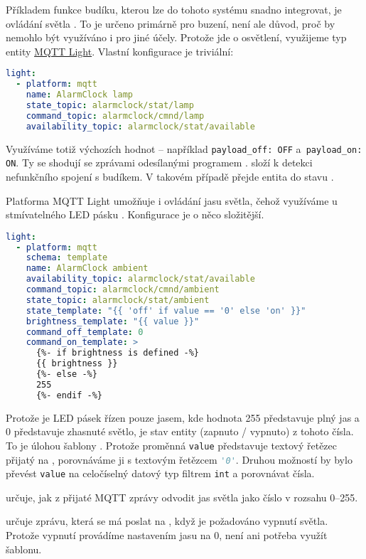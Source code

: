 Příkladem funkce budíku, kterou lze do tohoto systému snadno integrovat, je
ovládání světla . To je určeno primárně pro buzení, není ale důvod,
proč by nemohlo být využíváno i pro jiné účely. Protože jde o osvětlení,
využijeme typ entity
\href{https://www.home-assistant.io/integrations/light.mqtt}{MQTT Light}.
Vlastní konfigurace je triviální:
\begin{lstlisting}[language=yaml]
light:
  - platform: mqtt
    name: AlarmClock lamp
    state_topic: alarmclock/stat/lamp
    command_topic: alarmclock/cmnd/lamp
    availability_topic: alarmclock/stat/available
\end{lstlisting}
Využíváme totiž výchozích hodnot -- například \lstinline!payload_off: OFF!
a~\lstinline!payload_on: ON!. Ty se shodují se zprávami odesílanými programem
.  složí k detekci
nefunkčního spojení s budíkem. V takovém případě přejde entita
 do stavu .

Platforma \foreignlanguage{english}{MQTT Light} umožňuje i ovládání jasu
světla, čehož využíváme u stmívatelného LED pásku . Konfigurace je
o něco složitější.
\begin{lstlisting}[language=yaml]
light:
  - platform: mqtt
    schema: template
    name: AlarmClock ambient
    availability_topic: alarmclock/stat/available
    command_topic: alarmclock/cmnd/ambient
    state_topic: alarmclock/stat/ambient
    state_template: "{{ 'off' if value == '0' else 'on' }}"
    brightness_template: "{{ value }}"
    command_off_template: 0
    command_on_template: >
      {%- if brightness is defined -%}
      {{ brightness }}
      {%- else -%}
      255
      {%- endif -%}
\end{lstlisting}
Protože je LED pásek řízen pouze jasem, kde hodnota \num{255} představuje plný
jas a \num{0} představuje zhasnuté světlo, je stav entity (zapnuto / vypnuto)
z tohoto čísla. To je úlohou šablony . Protože proměnná
\texttt{value} představuje textový řetězec přijatý na ,
porovnáváme ji s textovým řetězcem \lstinline[language=Python]!'0'!. Druhou
možností by bylo převést \texttt{value} na celočíselný datový typ filtrem
\texttt{int} a porovnávat čísla.

 určuje, jak z přijaté MQTT zprávy odvodit jas
světla jako číslo v rozsahu \numrange{0}{255}.

 určuje zprávu, která se má poslat na
, když je požadováno vypnutí světla. Protože vypnutí
provádíme nastavením jasu na \num{0}, není ani potřeba využít šablonu.

